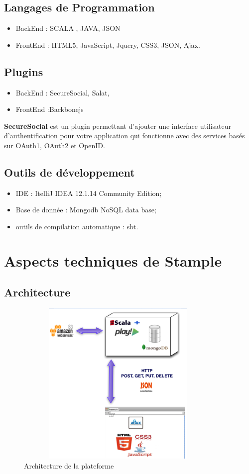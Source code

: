\subsection{Langages de Programmation}
\begin{itemize}
\item BackEnd : SCALA , JAVA, JSON
\item FrontEnd : HTML5, JavaScript, Jquery, CSS3, JSON, Ajax. 
\end{itemize}
\subsection{Plugins}
\begin{itemize}
\item BackEnd : SecureSocial, Salat, 
\item FrontEnd :Backbonejs 
\end{itemize}
\textbf{SecureSocial} est un plugin permettant d'ajouter une interface utilisateur d'authentification pour votre application qui fonctionne avec des services basés sur OAuth1, OAuth2 et OpenID.
\subsection{Outils de développement}
\begin{itemize}
\item IDE : ItelliJ IDEA 12.1.14 Community Edition;
\item Base de donnée : Mongodb NoSQL data base;
\item outils de compilation automatique : sbt.
\end{itemize}
\section{Aspects techniques de Stample}
\subsection{Architecture}
\begin{figure}[H]
        \centering
                \centering
                \includegraphics[width=10cm,height=8cm]{architectureStample.png}
                \caption{Architecture de la plateforme}
                \label{fig:Architecture de la plateforme}
       
\end{figure}
